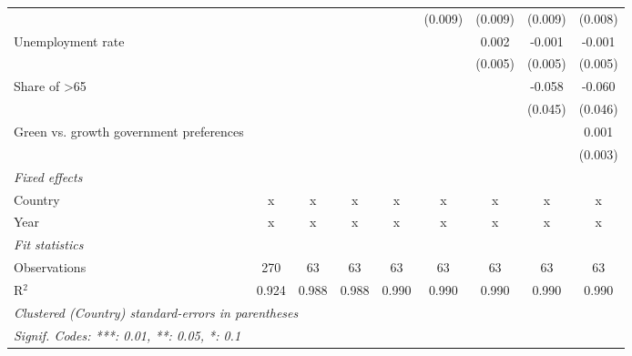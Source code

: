 \begin{table}[htbp]
\begin{tabular}{lcccccccc}
                                                                &         &         &         &               & (0.009)       & (0.009)       & (0.009)       & (0.008)\\   
      Unemployment rate                                         &         &         &         &               &               & 0.002         & -0.001        & -0.001\\   
                                                                &         &         &         &               &               & (0.005)       & (0.005)       & (0.005)\\   
      Share of >65                                              &         &         &         &               &               &               & -0.058        & -0.060\\   
                                                                &         &         &         &               &               &               & (0.045)       & (0.046)\\   
      Green vs. growth government preferences                   &         &         &         &               &               &               &               & 0.001\\   
                                                                &         &         &         &               &               &               &               & (0.003)\\   
      \emph{Fixed effects}\\
      Country                                                   & x       & x       & x       & x             & x             & x             & x             & x\\  
      Year                                                      & x       & x       & x       & x             & x             & x             & x             & x\\  
      \midrule \emph{Fit statistics}\\
      Observations                                              & 270     & 63      & 63      & 63            & 63            & 63            & 63            & 63\\  
      R$^2$                                                     & 0.924   & 0.988   & 0.988   & 0.990         & 0.990         & 0.990         & 0.990         & 0.990\\  
      \midrule
      \multicolumn{9}{l}{\emph{Clustered (Country) standard-errors in parentheses}}\\
      \multicolumn{9}{l}{\emph{Signif. Codes: ***: 0.01, **: 0.05, *: 0.1}}\\
   \end{tabular}
\end{table}



